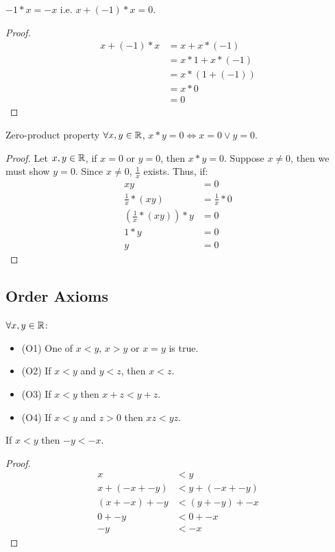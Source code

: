 \begin{theorem}{}{}
    $-1 * x = -x$ i.e. $x + (-1) * x = 0$.
\end{theorem}
\begin{proof}
    \begin{align*}
        x + (-1) * x &= x + x * (-1) \\
        &= x * 1 + x * (-1) \\
        &= x * (1 + (-1)) \\
        &= x * 0 \\
        &= 0
    \end{align*}
\end{proof}

\begin{theorem}{Zero-product property}{}
    $\forall x, y \in \mathbb{R}$, $x * y = 0 \iff x = 0 \lor y = 0$.
\end{theorem}
\begin{proof}
    Let $x, y \in \mathbb{R}$, if $x = 0$ or $y = 0$, then $x * y = 0$. Suppose $x \neq 0$, then we must show $y = 0$. Since $x \neq 0$, $\frac{1}{x}$ exists. Thus, if:
    \begin{align*}
        xy &= 0 \\
        \frac{1}{x} * (xy) &= \frac{1}{x} * 0 \\
        (\frac{1}{x} * (xy)) * y &= 0 \\
        1 * y &= 0 \\
        y &= 0
    \end{align*}
\end{proof}

\subsection{Order Axioms} $\forall x, y \in \mathbb{R}$:
\begin{itemize}
    \item (O1) One of $x < y$, $x > y$ or $x = y$ is true.
    \item (O2) If $x < y$ and $y < z$, then $x < z$.
    \item (O3) If $x < y$ then $x + z < y + z$.
    \item (O4) If $x < y$ and $z > 0$ then $xz < yz$.
\end{itemize}

\begin{theorem}{}{}
    If $x < y$ then $-y < -x$.
\end{theorem}
\begin{proof}
    \begin{align*}
        x &< y \\
        x + (-x + -y) &< y + (-x + -y) \\
        (x + -x) + -y &< (y + -y) + -x \\
        0 + -y &< 0 + -x \\
        -y &< -x
    \end{align*}
\end{proof}

